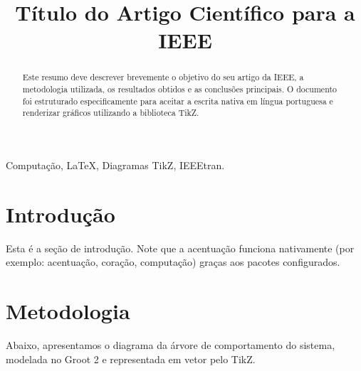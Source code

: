 \documentclass[conference]{IEEEtran}
\begin{document}
\title{Título do Artigo Científico para a IEEE}

\author{
    \and
}

\maketitle

\begin{abstract}
Este resumo deve descrever brevemente o objetivo do seu artigo da IEEE, a metodologia utilizada, os resultados obtidos e as conclusões principais. O documento foi estruturado especificamente para aceitar a escrita nativa em língua portuguesa e renderizar gráficos utilizando a biblioteca TikZ.
\end{abstract}

\begin{IEEEkeywords}
Computação, LaTeX, Diagramas TikZ, IEEEtran.
\end{IEEEkeywords}

\section{Introdução}
Esta é a seção de introdução. Note que a acentuação funciona nativamente (por exemplo: acentuação, coração, computação) graças aos pacotes configurados. 

\section{Metodologia}
Abaixo, apresentamos o diagrama da árvore de comportamento do sistema, modelada no Groot 2 e representada em vetor pelo TikZ.
\end{document}
